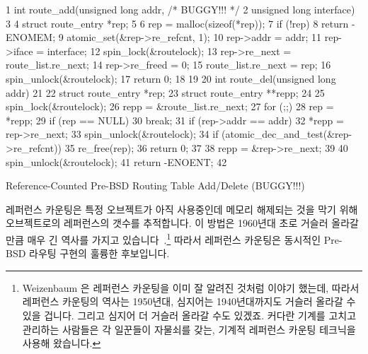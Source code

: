 \begin{listing}[tbp]
{ \scriptsize
\begin{verbbox}
 1 int route_add(unsigned long addr, /* BUGGY!!! */
 2               unsigned long interface)
 3 {
 4   struct route_entry *rep;
 5
 6   rep = malloc(sizeof(*rep));
 7   if (!rep)
 8     return -ENOMEM;
 9   atomic_set(&rep->re_refcnt, 1);
10   rep->addr = addr;
11   rep->iface = interface;
12   spin_lock(&routelock);
13   rep->re_next = route_list.re_next;
14   rep->re_freed = 0;
15   route_list.re_next = rep;
16   spin_unlock(&routelock);
17   return 0;
18 }
19
20 int route_del(unsigned long addr)
21 {
22   struct route_entry *rep;
23   struct route_entry **repp;
24
25   spin_lock(&routelock);
26   repp = &route_list.re_next;
27   for (;;) {
28     rep = *repp;
29     if (rep == NULL)
30       break;
31     if (rep->addr == addr) {
32       *repp = rep->re_next;
33       spin_unlock(&routelock);
34       if (atomic_dec_and_test(&rep->re_refcnt))
35         re_free(rep);
36       return 0;
37     }
38     repp = &rep->re_next;
39   }
40   spin_unlock(&routelock);
41   return -ENOENT;
42 }
\end{verbbox}
}
\centering
\theverbbox
\caption{Reference-Counted Pre-BSD Routing Table Add/Delete (BUGGY!!!)}
\label{lst:defer:Reference-Counted Pre-BSD Routing Table Add/Delete}
\end{listing}

레퍼런스 카운팅은 특정 오브젝트가 아직 사용중인데 메모리 해제되는 것을 막기
위해 오브젝트로의 레퍼런스의 갯수를 추적합니다.
이 방법은 1960년대 초로 거슬러 올라갈만큼 매우 긴 역사를 가지고
있습니다~\cite{Weizenbaum:1963:SLP:367593.367617}.\footnote{
	Weizenbaum 은 레퍼런스 카운팅을 이미 잘 알려진 것처럼 이야기 했는데,
	따라서 레퍼런스 카운팅의 역사는 1950년대, 심지어는 1940년대까지도
	거슬러 올라갈 수 있을 겁니다.
	그리고 심지어 더 거슬러 올라갈 수도 있겠죠.
	커다란 기계를 고치고 관리하는 사람들은 각 일꾼들이 자물쇠를 갖는,
	기계적 레퍼런스 카운팅 테크닉을 사용해 왔습니다.}
따라서 레퍼런스 카운팅은 동시적인 Pre-BSD 라우팅 구현의 훌륭한 후보입니다.

